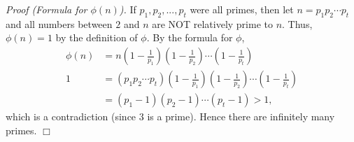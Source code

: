 \documentclass{article}
\begin{document}
\emph{Proof (Formula for $\phi(n)$).}
If
$p_1, p_2, ..., p_t$ were all primes, then let
$n = p_1 p_2 \cdots p_t$ and all numbers between $2$ and $n$ are
NOT relatively prime to $n$.
Thus, $\phi(n) = 1$ by the definition of $\phi$.
By the formula for $\phi$,
\begin{align*}
\phi(n)
&= n
\left( 1 - \frac{1}{p_1} \right)
\left( 1 - \frac{1}{p_2} \right)
\cdots
\left( 1 - \frac{1}{p_t} \right) \\
1
&= (p_1 p_2 \cdots p_t)
\left( 1 - \frac{1}{p_1} \right)
\left( 1 - \frac{1}{p_2} \right)
\cdots
\left( 1 - \frac{1}{p_t} \right) \\
&= (p_1 - 1)(p_2 - 1) \cdots (p_t - 1) > 1,
\end{align*}
which is a contradiction (since $3$ is a prime).
Hence there are infinitely many primes.
$\Box$ \\
\end{document}
